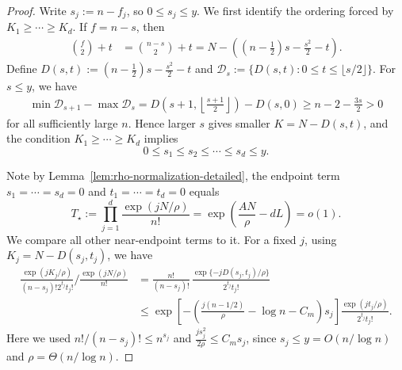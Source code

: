 \documentclass[10pt,a4paper]{amsart}
\renewcommand\le{\leqslant}
\renewcommand\ge{\geqslant}
\begin{document}
\begin{proof}
Write $s_j:=n-f_j$, so $0\le s_j\le y$. We first identify the ordering forced by $K_1\ge\cdots\ge K_d$. If $f=n-s$, then
\begin{align*}
        \binom f2+t
        &=\binom{n-s}{2}+t
          =N-\left(\left(n-\frac12\right)s-\frac{s^2}{2}-t\right).
\end{align*}
Define $D(s,t):=\left(n-\frac12\right)s-\frac{s^2}{2}-t$ and $\mathcal D_s:=\{D(s,t):0\le t\le\lfloor s/2\rfloor\}.$ For $s\le y$, we have
\begin{align*}
\min \mathcal D_{s+1}-\max \mathcal D_s
=D\left(s+1,\left\lfloor\frac{s+1}{2}\right\rfloor\right)-D(s,0) \ge n-2-\frac{3s}{2}>0
\end{align*}
for all sufficiently large $n$. Hence larger $s$ gives smaller $K=N-D(s,t)$, and the condition $K_1\ge\cdots\ge K_d$ implies
\begin{equation}\label{eq:defect-ordering-detailed}
        0\le s_1\le s_2\le\cdots\le s_d\le y .
\end{equation}

Note by Lemma~\ref{lem:rho-normalization-detailed}, the endpoint term $s_1=\cdots=s_d=0$ and $t_1=\cdots=t_d=0$ equals
\[
        T_\star:=\prod_{j=1}^d\frac{\exp(jN/\rho)}{n!}
        =\exp\left(\frac{AN}{\rho}-dL\right)=o(1).
\]
We compare all other near-endpoint terms to it. For a fixed $j$, using $K_j=N-D(s_j,t_j)$, we have
\begin{align*}
 \frac{\exp(jK_j/\rho)}{(n-s_j)!2^{t_j}t_j!}
 \bigg/ \frac{\exp(jN/\rho)}{n!}
 &=\frac{n!}{(n-s_j)!}\,
   \frac{\exp\{-jD(s_j,t_j)/\rho\}}{2^{t_j}t_j!}                 \\
 &\le \exp\left[-\left(\frac{j(n-1/2)}\rho-\log n-C_m\right)s_j\right]
       \frac{\exp(jt_j/\rho)}{2^{t_j}t_j!}.
\end{align*}
Here we used $n!/(n-s_j)!\le n^{s_j}$ and $\frac{j s_j^2}{2\rho}\le C_m s_j $, since $s_j\le y=O(n/\log n)$ and $\rho=\Theta(n/\log n)$.


\end{proof}
\end{document}

